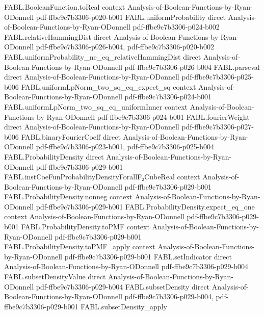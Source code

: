 \begin{theorem}
\proofstep
  {FABL.BooleanFunction.toReal}
  {context}
  {Analysis-of-Boolean-Functions-by-Ryan-ODonnell}
  {pdf-ffbe9c7b3306-p020-b001}
\proofstep
  {FABL.uniformProbability}
  {direct}
  {Analysis-of-Boolean-Functions-by-Ryan-ODonnell}
  {pdf-ffbe9c7b3306-p024-b002}
\proofstep
  {FABL.relativeHammingDist}
  {direct}
  {Analysis-of-Boolean-Functions-by-Ryan-ODonnell}
  {pdf-ffbe9c7b3306-p026-b004,
    pdf-ffbe9c7b3306-p020-b002}
\proofstep
  {FABL.uniformProbability_ne_eq_relativeHammingDist}
  {direct}
  {Analysis-of-Boolean-Functions-by-Ryan-ODonnell}
  {pdf-ffbe9c7b3306-p026-b004}
\proofstep
  {FABL.parseval}
  {direct}
  {Analysis-of-Boolean-Functions-by-Ryan-ODonnell}
  {pdf-ffbe9c7b3306-p025-b006}
\proofstep
  {FABL.uniformLpNorm_two_sq_eq_expect_sq}
  {context}
  {Analysis-of-Boolean-Functions-by-Ryan-ODonnell}
  {pdf-ffbe9c7b3306-p024-b001}
\proofstep
  {FABL.uniformLpNorm_two_sq_eq_uniformInner}
  {context}
  {Analysis-of-Boolean-Functions-by-Ryan-ODonnell}
  {pdf-ffbe9c7b3306-p024-b001}
\proofstep
  {FABL.fourierWeight}
  {direct}
  {Analysis-of-Boolean-Functions-by-Ryan-ODonnell}
  {pdf-ffbe9c7b3306-p027-b006}
\proofstep
  {FABL.binaryFourierCoeff}
  {direct}
  {Analysis-of-Boolean-Functions-by-Ryan-ODonnell}
  {pdf-ffbe9c7b3306-p023-b001,
    pdf-ffbe9c7b3306-p025-b004}
\proofstep
  {FABL.ProbabilityDensity}
  {direct}
  {Analysis-of-Boolean-Functions-by-Ryan-ODonnell}
  {pdf-ffbe9c7b3306-p029-b001}
\proofstep
  {FABL.instCoeFunProbabilityDensityForallF₂CubeReal}
  {context}
  {Analysis-of-Boolean-Functions-by-Ryan-ODonnell}
  {pdf-ffbe9c7b3306-p029-b001}
\proofstep
  {FABL.ProbabilityDensity.nonneg}
  {context}
  {Analysis-of-Boolean-Functions-by-Ryan-ODonnell}
  {pdf-ffbe9c7b3306-p029-b001}
\proofstep
  {FABL.ProbabilityDensity.expect_eq_one}
  {context}
  {Analysis-of-Boolean-Functions-by-Ryan-ODonnell}
  {pdf-ffbe9c7b3306-p029-b001}
\proofstep
  {FABL.ProbabilityDensity.toPMF}
  {context}
  {Analysis-of-Boolean-Functions-by-Ryan-ODonnell}
  {pdf-ffbe9c7b3306-p029-b001}
\proofstep
  {FABL.ProbabilityDensity.toPMF_apply}
  {context}
  {Analysis-of-Boolean-Functions-by-Ryan-ODonnell}
  {pdf-ffbe9c7b3306-p029-b001}
\proofstep
  {FABL.setIndicator}
  {direct}
  {Analysis-of-Boolean-Functions-by-Ryan-ODonnell}
  {pdf-ffbe9c7b3306-p029-b004}
\proofstep
  {FABL.subsetDensityValue}
  {direct}
  {Analysis-of-Boolean-Functions-by-Ryan-ODonnell}
  {pdf-ffbe9c7b3306-p029-b004}
\proofstep
  {FABL.subsetDensity}
  {direct}
  {Analysis-of-Boolean-Functions-by-Ryan-ODonnell}
  {pdf-ffbe9c7b3306-p029-b004,
    pdf-ffbe9c7b3306-p029-b001}
\proofstep
  {FABL.subsetDensity_apply}

\end{theorem}
